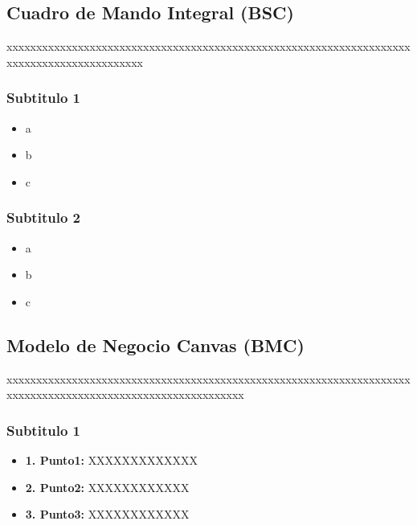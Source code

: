 \documentclass[preprint,12pt]{elsarticle}
\begin{document}
	\subsection{\textbf{Cuadro de Mando Integral (BSC)}}
	
xxxxxxxxxxxxxxxxxxxxxxxxxxxxxxxxxxxxxxxxxxxxxxxxxxxxxxxxxxxxxxxxxxxxxxxxxxxxxxxxxxxxxxxxxxx\cite{referenciarobles1}

\subsubsection{\textbf{Subtitulo 1}}

	\begin{itemize}
	\item a
	\item b
	\item c
	\end{itemize}



\subsubsection{\textbf{Subtitulo 2}}

	\begin{itemize}
	\item a
	\item b
	\item c
	\end{itemize}


	\subsection{\textbf{Modelo de Negocio Canvas (BMC) }}
	
xxxxxxxxxxxxxxxxxxxxxxxxxxxxxxxxxxxxxxxxxxxxxxxxxxxxxxxxxxxxxxxxxxxxxxxxxxxxxxxxxxxxxxxxxxxxxxxxxxxxxxxxxxxx

	\subsubsection{\textbf{Subtitulo 1}}
	\begin{itemize}
	\item{\textbf{1. Punto1: }}XXXXXXXXXXXXX
	\item {\textbf{2. Punto2: }}XXXXXXXXXXXX
	\item {\textbf{3. Punto3: }}XXXXXXXXXXXX
	\end{itemize}
\end{document}
